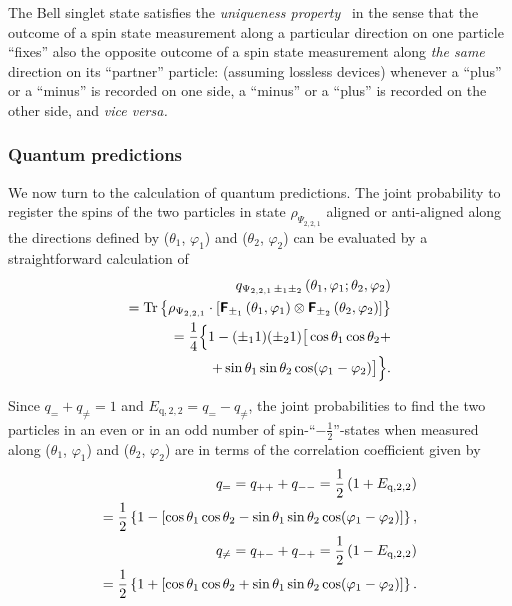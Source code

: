The Bell singlet state satisfies the {\em uniqueness property}~\cite{svozil-2006-uniquenessprinciple}
in the sense that the outcome of a spin state measurement
along a particular direction on one particle ``fixes'' also the opposite outcome of a spin state measurement
along {\em the same} direction on its ``partner'' particle: (assuming lossless devices)
whenever a ``plus'' or a ``minus'' is recorded on one side,
a ``minus'' or a ``plus'' is recorded on the other side, and {\it vice versa.}




\subsubsection{Quantum predictions}

We now turn to the calculation of quantum predictions.
The joint probability to register the spins of the two particles
in state $\rho_{\Psi_{2,2,1}}$
aligned or anti-aligned along the directions defined by
($\theta_1$, $\varphi_1 $) and
($\theta_2$, $\varphi_2 $)
can be evaluated by a straightforward calculation of
\begin{equation}
\begin{split}
q_{{ \Psi_{2,2,1}}\,\pm_1 \pm_2 } \left(\theta_1, \varphi_1 ; \theta_2,\varphi_2 \right)\\
=
{\rm Tr}\left\{\rho_{ \Psi_{2,2,1}} \cdot
\left[\textsf{\textbf{F}}_{\pm_1} \left(\theta_1, \varphi_1\right) \otimes
\textsf{\textbf{F}}_{\pm_2 }\left(\theta_2,\varphi_2 \right)
\right]\right\} \\
=\frac{1}{4}
\Big\{ 1-(\pm_1 1)( \pm_2 1) \big[\cos \theta_1 \cos \theta_2 + \\
+\sin \theta_1 \sin \theta_2 \cos (\varphi_1-\varphi_2) \big]\Big\}
.
\end{split}
\end{equation}

Since $q_= + q_{\neq} = 1$ and $E_{\text{q},2,2}= q_= - q_{\neq}$, the joint probabilities to find the two particles
in an even or in an odd number of
spin-``$-\frac{1}{2}$''-states when measured along
($\theta_1$, $\varphi_1 $) and
($\theta_2$, $\varphi_2 $)
are in terms of the correlation coefficient given by
\begin{equation}
\begin{split}
q_= = q_{++}+q_{--} =
{1\over2}\left(1 + E_{\text{q},2,2}  \right)  \\
=\frac{1}{2} \left\{ 1- \left[\cos \theta_1 \cos \theta_2 - \sin \theta_1 \sin \theta_2 \cos (\varphi_1-\varphi_2) \right]\right\}
,
\\
q_{\neq} = q_{+-}+q_{-+} =
{1\over2}\left(1 - E_{\text{q},2,2} \right)   \\
=\frac{1}{2} \left\{ 1+ \left[\cos \theta_1 \cos \theta_2 + \sin \theta_1 \sin \theta_2 \cos (\varphi_1-\varphi_2) \right]\right\}
.
\end{split}
\end{equation}

